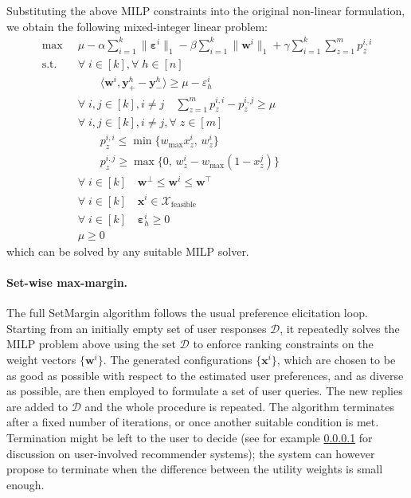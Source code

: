 \documentclass{article}
\renewcommand\[{\begin{equation}}
\renewcommand\]{\end{equation}}
\newcommand{\calvar}[1]{\ensuremath{\mathcal{#1}}}
\newcommand{\calD}{\calvar{D}}
\newcommand{\calX}{\calvar{X}}
\newcommand{\vecvar}[1]{\ensuremath{\boldsymbol{#1}}}
\newcommand{\vw}{\vecvar{w}}
\newcommand{\vx}{\vecvar{x}}
\newcommand{\vy}{\vecvar{y}}
\newcommand{\veps}{\vecvar{\varepsilon}}
\newcommand{\andrea}[1]{{\bf \textcolor{blue}{{\fbox{Andrea:} #1}}}}
\begin{document}
Substituting the above MILP constraints into the original non-linear
formulation, we obtain the following mixed-integer linear problem:
%
{\footnotesize
\begin{align}
    \max
        & \;\; \mu - \alpha \sum_{i=1}^k \| \veps^{i} \|_1 - \beta \sum_{i=1}^k \| \vw^{i} \|_1 + \gamma \sum_{i=1}^k \sum_{z=1}^m p^{i,i}_z
        \nonumber
    \\
    \text{s.t.}
        & \;\; \forall \; i \in [k], \forall \; h \in [n] \nonumber
    \\
        & \;\; \qquad \langle \vw^{i}, \vy^{h}_+ - \vy^{h}_- \rangle \ge \mu - \varepsilon^{i}_h \nonumber
    \\
        & \;\; \forall \; i, j \in [k], i \neq j \quad \sum_{z=1}^m p^{i,i}_z - p^{i,j}_z \ge \mu
    \\
        & \;\; \forall \; i, j \in [k], i \neq j, \forall \; z \in [m] \nonumber
    \\
        & \;\; \qquad p^{i,i}_z \le \min \{ w_\text{max} x^{i}_z, \, w^{i}_z \}
    \\
        & \;\; \qquad p^{i,j}_z \ge \max \{ 0, \, w^{i}_z - w_\text{max}(1 - x^{j}_z) \}
    \\
        & \;\; \forall \; i \in [k] \quad \vw^\bot \le \vw^{i} \le \vw^\top \label{eq:wbounds2}
    \\
        & \;\; \forall \; i \in [k] \quad \vx^{i} \in \calX_{\text{feasible}} \nonumber
    \\
        & \;\; \forall \; i \in [k] \quad \veps^{i}_h \ge 0 \nonumber
    \\
        & \;\; \mu \ge 0 \nonumber
\end{align}
}
%
which can be solved by any suitable MILP solver.

\paragraph{Set-wise max-margin.} The full {\sc SetMargin} algorithm
follows the usual preference elicitation loop. Starting from an
initially empty set of user responses $\calD$, it repeatedly solves
the MILP problem above using the set $\calD$ to enforce ranking
constraints on the weight vectors $\{\vw^i\}$. The generated
configurations $\{\vx^i\}$, which are chosen to be as good as possible
with respect to the estimated user preferences, and as diverse as
possible, are then employed to formulate a set of user queries. The
new replies are added to $\calD$ and the whole procedure is
repeated. The algorithm terminates after a fixed number of iterations,
or once another suitable condition is met. 
Termination might be left to the user to decide (see for example \ref{} for discussion on user-involved recommender systems); the system can however propose
to terminate when the difference between the utility weights is small enough.
\end{document}
